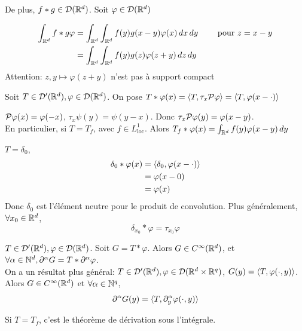 \documentclass[]{report}
\begin{document}
    De plus, $f*g\in \mathcal{D}(\mathbb{R}^d)$. Soit $\varphi\in \mathcal{D}(\mathbb{R}^d)$

    \begin{align*}
        \int_{\mathbb{R}^d}f*g\varphi&=\int_{\mathbb{R}^d}\int_{\mathbb{R}^d}f(y)g(x-y)\varphi(x)\, dx\, dy\qquad \text{ pour $z=x-y$}\\
        &=\int_{\mathbb{R}^d}\int_{\mathbb{R}^d}f(y)g(z)\varphi(z+y)\, dz\, dy
    \end{align*}
    Attention: $z,y\mapsto \varphi(z+y)$ n'est pas à support compact

    \begin{df}{}{}
        Soit $T\in \mathcal{D}'(\mathbb{R}^d),\varphi\in \mathcal{D}(\mathbb{R}^d)$. On pose $T*\varphi(x)=\langle T,\tau_x \mathcal{P} \varphi \rangle=\langle T,\varphi(x-\cdot) \rangle$
    \end{df}

    \begin{ra}{}{}
        $\mathcal{P}\varphi (x)=\varphi(-x)$, $\tau_x \psi(y)=\psi(y-x)$. Donc $\tau_x\mathcal{P} \varphi(y)=\varphi(x-y)$.\\
        En particulier, si $T=T_f$, avec $f\in L^1_{\text{loc}}$. Alors $T_f*\varphi (x)=\int_{\mathbb{R}^d}f(y)\varphi(x-y)\, dy$
    \end{ra}

    \begin{ex}{}{}
        $T=\delta_0$,
        \begin{align*}
            \delta_0*\varphi(x)&=\langle \delta_0,\varphi(x-\cdot) \rangle\\
            &=\varphi(x-0)\\
            &=\varphi(x)
        \end{align*}
        Donc $\delta_0$ est l'élément neutre pour le produit de convolution. Plus généralement, $\forall x_0\in \mathbb{R}^d$,
        \[\delta_{x_0}*\varphi=\tau_{x_0}\varphi\]
    \end{ex}

    \begin{prop}{}{}
        $T\in \mathcal{D}'(\mathbb{R}^d),\varphi\in \mathcal{D}(\mathbb{R}^d)$. Soit $G=T*\varphi$. Alors $G\in C^{\infty}(\mathbb{R}^d)$, et $\forall \alpha \in \mathbb{N}^d,\partial^\alpha G=T*\partial^\alpha\varphi$.\\
        On a un résultat plus général: $T\in \mathcal{D}'(\mathbb{R}^d),\varphi\in \mathcal{D}(\mathbb{R}^d\times \mathbb{R}^q)$, $G(y)=\langle T,\varphi(\cdot,y) \rangle$. Alors $G\in C^\infty(\mathbb{R}^d)$ et $\forall \alpha \in \mathbb{N}^q$,
        \[\partial^{\alpha}G(y)=\langle T,\partial_y^\alpha \varphi(\cdot,y) \rangle\]
    \end{prop}

    \begin{re}{}{}
        Si $T=T_f$, c'est le théorème de dérivation sous l'intégrale.
    \end{re}
\end{document}
